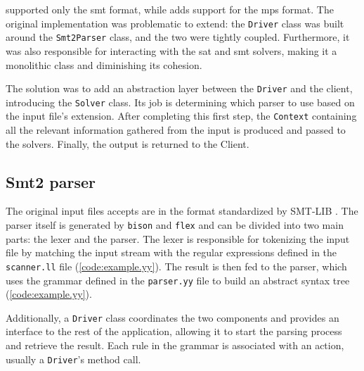 \dlinearfour supported only the \gls{smt} format, while \dlinear adds support for the \gls{mps} format.
The original implementation was problematic to extend: the \texttt{Driver} class was built around the \texttt{Smt2Parser} class, and the two were tightly coupled.
Furthermore, it was also responsible for interacting with the \gls{sat} and \gls{smt} solvers, making it a monolithic class and diminishing its cohesion.

The solution was to add an abstraction layer between the \texttt{Driver} and the client, introducing the \texttt{Solver} class.
Its job is determining which parser to use based on the input file's extension.
After completing this first step, the \texttt{Context} containing all the relevant information gathered from the input is produced and passed to the solvers.
Finally, the output is returned to the Client.

\subsection*{Smt2 parser}

The original input files \dlinear accepts are in the format standardized by SMT-LIB \cite{docs:smtlib}.
The parser itself is generated by \texttt{bison} and \texttt{flex} and can be divided into two main parts: the lexer and the parser.
The lexer is responsible for tokenizing the input file by matching the input stream with the regular expressions defined in the \texttt{scanner.ll} file (\autoref{code:example.yy}).
The result is then fed to the parser, which uses the grammar defined in the \texttt{parser.yy} file to build an abstract syntax tree (\autoref{code:example.yy}).

Additionally, a \texttt{Driver} class coordinates the two components and provides an interface to the rest of the application, allowing it to start the parsing process and retrieve the result.
Each rule in the grammar is associated with an action, usually a \texttt{Driver}'s method call.





